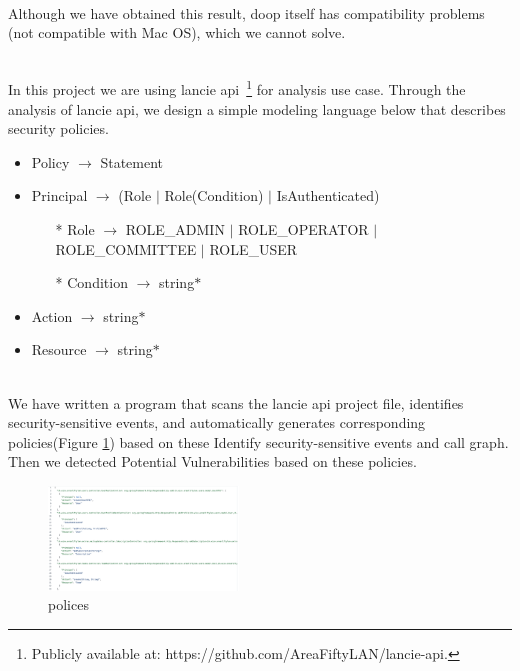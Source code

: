   ~\\
  Although we have obtained this result, doop itself has compatibility problems (not compatible with Mac OS), which we cannot solve.
  
  ~\\
  In this project we are using lancie api~\footnote{Publicly
  available at: https://github.com/AreaFiftyLAN/lancie-api.} for analysis use case. Through the analysis of lancie api, we design a simple modeling language below that describes security policies.
    \begin{itemize}
        \item Policy $\rightarrow$ Statement
        \item Principal $\rightarrow$ (Role $|$ Role(Condition) $|$ IsAuthenticated)
        \begin{itemize}
            \item[*] Role $\rightarrow$ ROLE\_ADMIN $|$ ROLE\_OPERATOR $|$ ROLE\_COMMITTEE $|$ ROLE\_USER
            \item[*] Condition $\rightarrow$ string$*$
        \end{itemize}
        \item Action $\rightarrow$ string$*$ 
        \item Resource $\rightarrow$ string$*$
    \end{itemize}

  ~\\
  We have written a program that scans the lancie api project file, identifies security-sensitive events, and automatically generates corresponding policies(Figure \ref{fig:policies}) based on these Identify security-sensitive events and call graph. Then we detected Potential Vulnerabilities based on these policies. 
    \begin{figure}[htp]
    \centering
    \includegraphics[width=0.45\textwidth]{img/policies.png}
    \caption{polices}
    \label{fig:policies}
    \end{figure}

